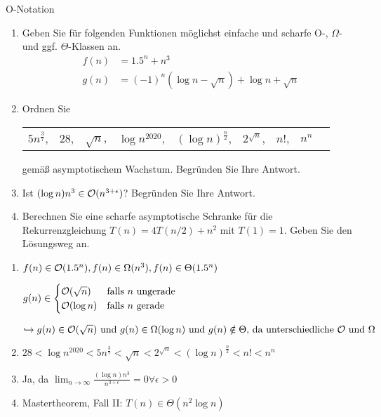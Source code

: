 \documentclass{article}
\begin{document}
\begin{exercise}{O-Notation}
  \begin{enumerate}
    \item Geben Sie für folgenden Funktionen möglichst einfache und scharfe O-, $\Omega$- und ggf. $\Theta$-Klassen an.
          \begin{align*}
            f(n) & = 1.5^n + n^3                                    \\
            g(n) & = (-1)^n (\log n - \sqrt{n}) + \log n + \sqrt{n}
          \end{align*}
    \item Ordnen Sie\par
          \begin{table*}[ht]
            \centering
            \begin{tabular}{ccccc cccc}
              $5n^{\frac{3}{7}}$, & $28$, & $\sqrt{n}$, & $\log n^{2020}$, & $(\log n)^{\frac{n}{2}}$, & $2^{\sqrt{n}}$, & $n!$, & $n^n$
            \end{tabular}
          \end{table*}\par
          gemäß asymptotischem Wachstum. Begründen Sie Ihre Antwort.
    \item Ist $(\log n)n^3 \in \mathcal{O}(n^{3+\epsilon})$? Begründen Sie Ihre Antwort.
    \item Berechnen Sie eine scharfe asymptotische Schranke für die Rekurrenzgleichung $T(n) = 4T(n/2) + n^2$ mit $T(1) = 1$. Geben Sie den Lösungsweg an.
  \end{enumerate}

  \begin{solution}
    \begin{enumerate}
      \item $f(n) \in \mathcal{O}(1.5^n), f(n) \in \Omega(n^3), f(n) \in \Theta(1.5^n)$\par
            $g(n) \in \begin{cases}
                \mathcal{O}(\sqrt{n}) & \text{falls } n \text{ ungerade} \\
                \mathcal{O}(\log n)   & \text{falls } n \text{ gerade}   \\
              \end{cases}$\par
            $\hookrightarrow g(n) \in \mathcal{O}(\sqrt{n}) \text{ und } g(n) \in \Omega(\log n) \text{ und } g(n) \notin \Theta \text{, da unterschiedliche } \mathcal{O} \text{ und } \Omega$
      \item $28 < \log n^{2020} < 5n^{\frac{3}{7}} < \sqrt{n} < 2^{\sqrt{n}} < (\log n)^{\frac{n}{2}} < n! < n^n$
      \item Ja, da $\lim_{n \to \infty} \frac{(\log n)n^3}{n^{3+\epsilon}} = 0\forall\epsilon > 0$
      \item Mastertheorem, Fall II: $T(n) \in \Theta(n^2 \log n)$
    \end{enumerate}
  \end{solution}
\end{exercise}
\end{document}
